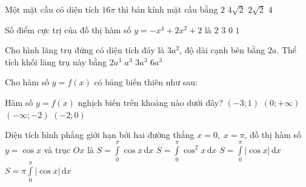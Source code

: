 \begin{ex}%
Một mặt cầu có diện tích $16\pi$ thì bán kính mặt cầu bằng
\choice
{\True $2$}
{$4\sqrt{2}$}
{$2\sqrt{2}$}
{$4$}
\end{ex}

\begin{ex}%
Số điểm cực trị của đồ thị hàm số $y=-x^4+2x^2+2$ là
\choice
{$2$}
{\True $3$}
{$0$}
{$1$}
\end{ex}

\begin{ex}%
Cho hình lăng trụ đứng có diện tích đáy là $3a^2$, độ dài cạnh bên bằng $2a$. Thể tích khối lăng trụ này bằng
\choice
{$2a^3$}
{$a^3$}
{$3a^3$}
{\True $6a^3$}
\end{ex}

\begin{ex}%
Cho hàm số $ y=f(x) $ có bảng biến thiên như sau:
\begin{center}
\end{center}
Hàm số $ y=f(x) $ nghịch biến trên khoảng nào dưới đây?
\choice
{$ (-3;1) $}
{$ (0;+\infty) $}
{$ (-\infty;-2) $}
{\True $ (-2;0) $}
\end{ex}

\begin{ex}%
Diện tích hình phẳng giới hạn bởi hai đường thẳng $ x=0,\;x=\pi $, đồ thị hàm số $ y=\cos x $ và trục $ Ox $ là
\choice
{$ S=\displaystyle\int\limits_{0}^{\pi}\cos x\mathrm{\, d}x $}
{$ S=\displaystyle\int\limits_{0}^{\pi}\cos^2x\mathrm{\, d}x $}
{\True $ S=\displaystyle\int\limits_{0}^{\pi}|\cos x|\mathrm{\, d}x $}
{$ S=\pi\displaystyle\int\limits_{0}^{\pi}|\cos x|\mathrm{\, d}x $}
\end{ex}

